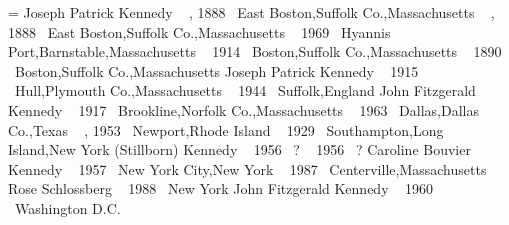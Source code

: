 


\Poster[hcenter=true,%
        vcenter=true,%
        clip=pstricks,%
        cropwidth=.4pt]
\vbox{=\vbox{%
{\descfont Joseph Patrick Kennedy}
\sepline 
{} \btag\ { \sep{} 1888} {\placefont \at\ }{\placefont East Boston,Suffolk Co.,Massachusetts}
 \bapttag\ { \sep{} 1888} {\placefont \at\ }{\placefont East Boston,Suffolk Co.,Massachusetts}
 \dtag\ { \nov{} 1969} {\placefont \at\ }{\placefont Hyannis Port,Barnstable,Massachusetts}
 \mtag\ { \oct{} 1914} {\placefont \at\ }{\placefont Boston,Suffolk Co.,Massachusetts}
 \btag\ { \jul{} 1890} {\placefont \at\ }{\placefont Boston,Suffolk Co.,Massachusetts}
% 
{\descfont Joseph Patrick Kennedy}
 \btag\ { \jul{} 1915} {\placefont \at\ }{\placefont Hull,Plymouth Co.,Massachusetts}
 \dtag\ { \aug{} 1944} {\placefont \at\ }{\placefont Suffolk,England}
\endsubtree 
{}%
{\descfont John Fitzgerald Kennedy}
\sepline 
{} \btag\ { \may{} 1917} {\placefont \at\ }{\placefont Brookline,Norfolk Co.,Massachusetts}
 \dtag\ { \nov{} 1963} {\placefont \at\ }{\placefont Dallas,Dallas Co.,Texas}
 \mtag\ { \sep{} 1953} {\placefont \at\ }{\placefont Newport,Rhode Island}
 \btag\ { \jul{} 1929} {\placefont \at\ }{\placefont Southampton,Long Island,New York}
% 
{\descfont (Stillborn) Kennedy}
 \btag\ { \aug{} 1956} {\placefont \at\ }{\placefont  ? }
 \dtag\ { \aug{} 1956} {\placefont \at\ }{\placefont  ? }
\endsubtree 
{}%
{\descfont Caroline Bouvier Kennedy}
\sepline 
{} \btag\ { \nov{} 1957} {\placefont \at\ }{\placefont New York City,New York}
 \mtag\ { \jul{} 1987} {\placefont \at\ }{\placefont Centerville,Massachusetts}
% 
{\descfont Rose Schlossberg}
 \btag\ { \jun{} 1988} {\placefont \at\ }{\placefont New York}
\endsubtree 
\endsubtree 
{}%
{\descfont John Fitzgerald Kennedy}
 \btag\ { \nov{} 1960} {\placefont \at\ }{\placefont Washington D.C.}
\endsubtree 
{}%
}}
